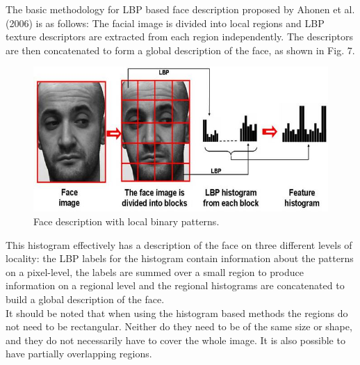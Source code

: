 \documentclass[12pt,a4paper]{article}
\begin{document}
The basic methodology for LBP based face description proposed by Ahonen et al. (2006) is as follows: The facial image is divided into local regions and LBP texture descriptors are extracted from each region independently. The descriptors are then concatenated to form a global description of the face, as shown in Fig. 7.
\begin{figure}[h!]
\centerline{\includegraphics[scale=0.7]{LBP-face.jpg}}
\caption{Face description with local binary patterns.}
\label{fig 7}
\end{figure}
This histogram effectively has a description of the face on three different levels of locality: the LBP labels for the histogram contain information about the patterns on a pixel-level, the labels are summed over a small region to produce information on a regional level and the regional histograms are concatenated to build a global description of the face.
\\
It should be noted that when using the histogram based methods the regions do not need to be rectangular. Neither do they need to be of the same size or shape, and they do not necessarily have to cover the whole image. It is also possible to have partially overlapping regions.
\end{document}
